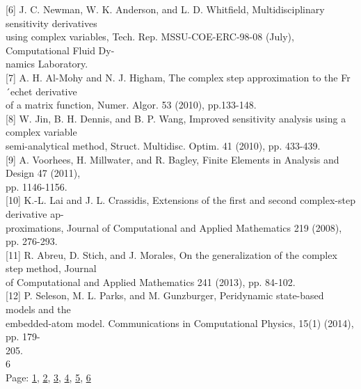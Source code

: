 {[}6{]} J. C. Newman, W. K. Anderson, and L. D. Whitﬁeld,
Multidisciplinary sensitivity derivatives \\using complex variables,
Tech. Rep. MSSU-COE-ERC-98-08 (July), Computational Fluid Dy- \\namics
Laboratory. \\

{[}7{]} A. H. Al-Mohy and N. J. Higham, The complex step approximation
to the Fr ´echet derivative \\of a matrix function, Numer. Algor. 53
(2010), pp.133-148. \\

{[}8{]} W. Jin, B. H. Dennis, and B. P. Wang, Improved sensitivity
analysis using a complex variable \\semi-analytical method, Struct.
Multidisc. Optim. 41 (2010), pp. 433-439. \\

{[}9{]} A. Voorhees, H. Millwater, and R. Bagley, Finite Elements in
Analysis and Design 47 (2011), \\pp. 1146-1156. \\

{[}10{]} K.-L. Lai and J. L. Crassidis, Extensions of the ﬁrst and
second complex-step derivative ap- \\proximations, Journal of
Computational and Applied Mathematics 219 (2008), pp. 276-293. \\

{[}11{]} R. Abreu, D. Stich, and J. Morales, On the generalization of
the complex step method, Journal \\of Computational and Applied
Mathematics 241 (2013), pp. 84-102. \\

{[}12{]} P. Seleson, M. L. Parks, and M. Gunzburger, Peridynamic
state-based models and the \\embedded-atom model. Communications in
Computational Physics, 15(1) (2014), pp. 179- \\205. \\

6 \\

Page: \hyperref[1]{1}, \hyperref[2]{2}, \hyperref[3]{3},
\hyperref[4]{4}, \hyperref[5]{5}, \hyperref[6]{6}
